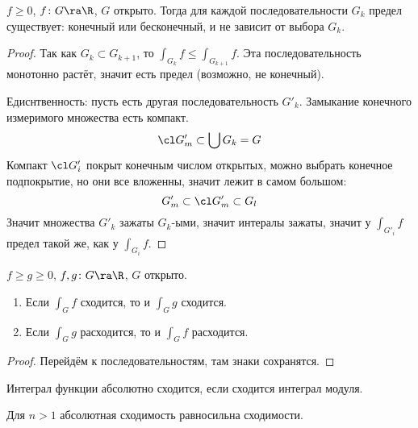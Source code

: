 \begin{theorem}
	$f \ge 0$, $f\colon G \ra \R$, $G$ открыто.
	Тогда для каждой последовательности $G_k$ предел существует: конечный или бесконечный, и не зависит от выбора $G_k$.
\end{theorem}
\begin{proof}
	Так как $G_k \subset G_{k+1}$, то $\int_{G_k} f \le \int_{G_{k+1}} f$.
	Эта последовательность монотонно растёт, значит есть предел (возможно, не конечный).

	Едиснтвенность: пусть есть другая последовательность $G'_k$.
	Замыкание конечного измеримого множества есть компакт.
	\[ \cl G'_m \subset \bigcup G_k = G \]
	Компакт $\cl G'_i$ покрыт конечным числом открытых, можно выбрать конечное подпокрытие, но они все вложенны, значит лежит в самом большом:
	\[ G'_m \subset \cl G'_m \subset G_l \]
	Значит множества $G'_k$ зажаты $G_k$-ыми, значит интералы зажаты, значит у $\int_{G'_i} f$ предел такой же, как у $\int_{G_i} f$.
\end{proof}

\begin{conseq}
	$f \ge g \ge 0$, $f,g \colon G \ra \R$, $G$ открыто.
	\begin{enumerate}
		\item Если $\int_G f$ сходится, то и $\int_G g$ сходится.
		\item Если $\int_G g$ расходится, то и $\int_G f$ расходится.
	\end{enumerate}
\end{conseq}
\begin{proof}
	Перейдём к последовательностям, там знаки сохранятся.
\end{proof}

\begin{Def}
	Интеграл функции абсолютно сходится, если сходится интеграл модуля.
\end{Def}

\begin{theorem}
	Для $n > 1$ абсолютная сходимость равносильна сходимости.
\end{theorem}
